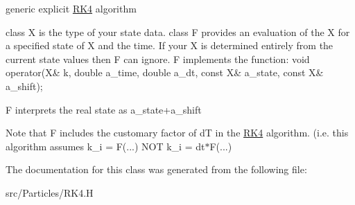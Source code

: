 generic explicit \hyperlink{class_r_k4}{R\+K4} algorithm 

class X is the type of your state data. class F provides an evaluation of the X\textquotesingle{} for a specified state of X and the time. If your X\textquotesingle{} is determined entirely from the current state values then F can ignore. F implements the function\+: void operator(\+X\& k, double a\+\_\+time, double a\+\_\+dt, const X\& a\+\_\+state, const X\& a\+\_\+shift);

F interprets the real state as a\+\_\+state+a\+\_\+shift

Note that F includes the customary factor of dT in the \hyperlink{class_r_k4}{R\+K4} algorithm. (i.\+e. this algorithm assumes k\+\_\+i = F(...) N\+OT k\+\_\+i = dt$\ast$F(...) 

The documentation for this class was generated from the following file\+:\begin{DoxyCompactItemize}
\item 
src/\+Particles/R\+K4.\+H\end{DoxyCompactItemize}
